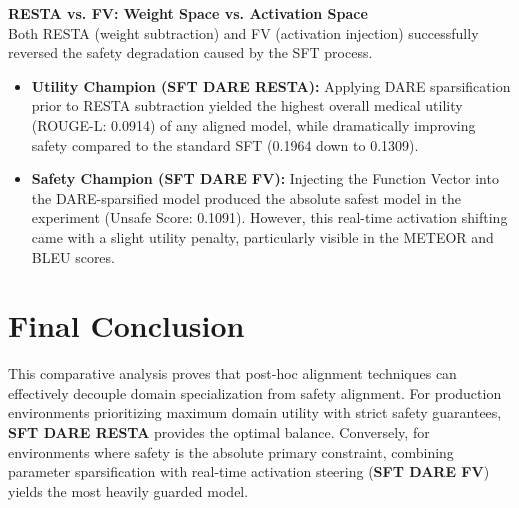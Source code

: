 \documentclass{article}
\begin{document}
\vspace{1em}
\noindent\textbf{RESTA vs. FV: Weight Space vs. Activation Space}\\
Both RESTA (weight subtraction) and FV (activation injection) successfully reversed the safety degradation caused by the SFT process. 
\begin{itemize}
    \item \textbf{Utility Champion (SFT DARE RESTA):} Applying DARE sparsification prior to RESTA subtraction yielded the highest overall medical utility (ROUGE-L: 0.0914) of any aligned model, while dramatically improving safety compared to the standard SFT (0.1964 down to 0.1309). 
    \item \textbf{Safety Champion (SFT DARE FV):} Injecting the Function Vector into the DARE-sparsified model produced the absolute safest model in the experiment (Unsafe Score: 0.1091). However, this real-time activation shifting came with a slight utility penalty, particularly visible in the METEOR and BLEU scores.
\end{itemize}

\section*{Final Conclusion}
This comparative analysis proves that post-hoc alignment techniques can effectively decouple domain specialization from safety alignment. For production environments prioritizing maximum domain utility with strict safety guarantees, \textbf{SFT DARE RESTA} provides the optimal balance. Conversely, for environments where safety is the absolute primary constraint, combining parameter sparsification with real-time activation steering (\textbf{SFT DARE FV}) yields the most heavily guarded model.
\end{document}
